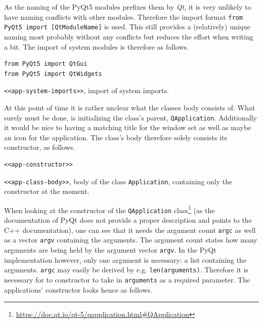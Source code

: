 \documentclass[10pt, openright, notitlepage]{scrreprt}
\begin{document}
As the naming of the PyQt5 modules prefixes them by \emph{Qt}, it is very unlikely to
have naming conflicts with other modules. Therefore the import format \texttt{from
PyQt5 import [QtModuleName]} is used. This still provides a (relatively) unique
naming most probably without any conflicts but reduces the effort when
writing a bit. The import of system modules is therefore as follows.

\begin{listing}[H]
\begin{verbatim}
from PyQt5 import QtGui
from PyQt5 import QtWidgets
\end{verbatim}
\caption{\label{app-system-imports}
\texttt{<<app-system-imports>>}, import of system imports.}
\end{listing}

At this point of time it is rather unclear what the classes body consists of.
What surely must be done, is initializing the class's parent, \texttt{QApplication}.
Additionally it would be nice to having a matching title for the window set as
well as maybe an icon for the application. The class's body therefore solely
consists its constructor, as follows.

\begin{listing}[H]
\begin{verbatim}
<<app-constructor>>
\end{verbatim}
\caption{\label{app-class-body}
\texttt{<<app-class-body>>}, body of the class \texttt{Application}, containing only the constructor at the moment.}
\end{listing}

When looking at the constructor of the \texttt{QApplication}
class\footnote{\url{https://doc.qt.io/qt-5/qapplication.html\#QApplication}} (as the
documentation of PyQt does not provide a proper description and points to the
C++ documentation), one can see that it needs the argument count \texttt{argc} as well
as a vector \texttt{argv} containing the arguments. The argument count states how many
arguments are being held by the argument vector \texttt{argv}. In the PyQt
implementation however, only one argument is necessary: a list containing the
arguments. \texttt{argc} may easily be derived by e.g. \texttt{len(arguments)}. Therefore it
is necessary for to constructor to take in \texttt{arguments} as a required parameter.
The applications' constructor looks hence as follows.
\end{document}
